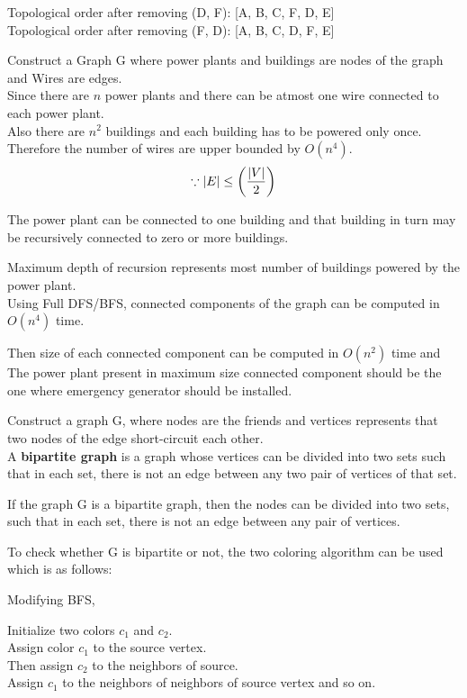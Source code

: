 \documentclass[12pt,twoside]{article}
\begin{document}
\begin{problems}
\begin{problemparts}
\problempart %
Topological order after removing (D, F): [A, B, C, F, D, E] \\
Topological order after removing (F, D): [A, B, C, D, F, E] 

\end{problemparts}

\newpage
\problem  %

Construct a Graph G where power plants and buildings are nodes of the graph and Wires are edges. \\

Since there are $n$ power plants and there can be atmost one wire connected to each power plant. \\
Also there are $n^2$ buildings and each building has to be powered only once. Therefore the number of wires are upper bounded by $O(n^4)$.
\[\because \left| E\right| \le \left( \frac{\left| V\right|}{2} \right)\]

The power plant can be connected to one building and that building in turn may be recursively connected to zero or more buildings.

Maximum depth of recursion represents most number of buildings powered by the power plant. \\

Using Full DFS/BFS, connected components of the graph can be computed in $O(n^4)$ time.

Then size of each connected component can be computed in $O(n^2)$ time and The power plant present in maximum size connected component should be the one where emergency generator should be installed.

\newpage
\problem  %

Construct a graph G, where nodes are the friends and vertices represents that two nodes of the edge short-circuit each other. \\

A \textbf{bipartite graph} is a graph whose vertices can be divided into two sets such that in each set, there is not an edge between any two pair of vertices of that set.

If the graph G is a bipartite graph, then the nodes can be divided into two sets, such that in each set, there is not an edge between any pair of vertices.

To check whether G is bipartite or not, the two coloring algorithm can be used which is as follows:

Modifying BFS,

Initialize two colors $c_1$ and $c_2$. \\
Assign color $c_1$ to the source vertex. \\
Then assign $c_2$ to the neighbors of source. \\
Assign $c_1$ to the neighbors of neighbors of source vertex and so on.


\end{problems}
\end{document}
